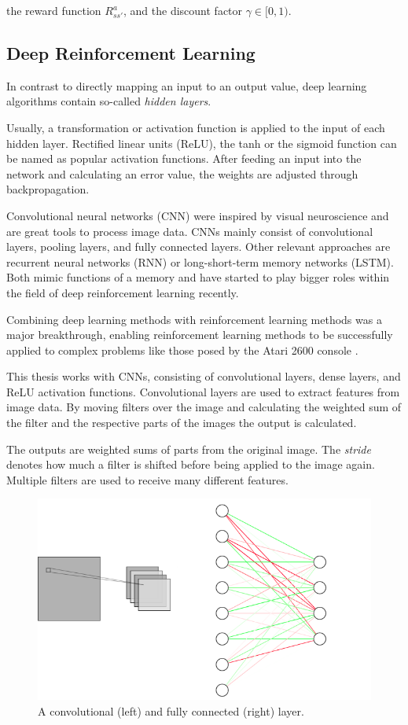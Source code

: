 the reward function $R^a_{s s'}$,
and the discount factor $\gamma  \in [0,1)$.

\subsection{Deep Reinforcement Learning}
In contrast to directly mapping an input to an output value, deep learning algorithms contain so-called \textit{hidden layers}.


Usually, a transformation or activation function is applied to the input of each hidden layer. Rectified linear units (ReLU), the tanh or the sigmoid function can be named as popular activation functions.
After feeding an input into the network and calculating an error value, the weights are adjusted through backpropagation.

Convolutional neural networks (CNN) were inspired by visual neuroscience and are great tools to process image data. CNNs mainly consist of convolutional layers, pooling layers, and fully connected layers.
Other relevant approaches are recurrent neural networks (RNN) or long-short-term memory networks (LSTM). Both mimic functions of a memory and have started to play bigger roles within the field of deep reinforcement learning recently.

Combining deep learning methods with reinforcement learning methods was a major breakthrough, enabling reinforcement learning methods to be successfully applied to complex problems like those posed by the Atari 2600 console \citep{deeprlLi}.

This thesis works with CNNs, consisting of convolutional layers, dense layers, and ReLU activation functions.
\pagebreak
Convolutional layers are used to extract features from image data. By moving filters over the image and calculating the weighted sum of the filter and the respective parts of the images the output is calculated. 

The outputs are weighted sums of parts from the original image.
The \textit{stride} denotes how much a filter is shifted before being applied to the image again. Multiple filters are used to receive many different features.

\begin{figure}
\includegraphics[scale=0.5]{bilder/deeplayers.png}
\caption{A convolutional (left) and fully connected (right) layer.
}
\label{networks}
\end{figure}

